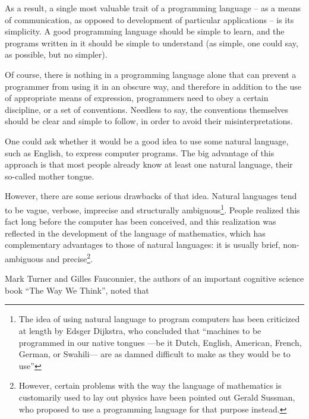 As a result, a single most valuable trait of a programming language
-- as a means of communication, as opposed to development of particular
applications -- is its simplicity. A good programming language should
be simple to learn, and the programs written in it should be simple
to understand (as simple, one could say, as possible, but no simpler).

Of course, there is nothing in a programming language alone that
can prevent a programmer from using it in an obscure way, and therefore
in addition to the use of appropriate means of expression, programmers
need to obey a certain discipline, or a set of conventions. Needless
to say, the conventions themselves should be clear and simple to follow,
in order to avoid their misinterpretations.

One could ask whether it would be a good idea to use some natural language,
such as English, to express computer programs. The big advantage of this
approach is that most people already know at least one natural language,
their so-called mother tongue.

However, there are some serious drawbacks of that idea. Natural languages
tend to be vague, verbose, imprecise and structurally ambiguous\footnote{
  The idea of using natural language to program computers has been criticized
  at length by Edsger Dijkstra, who concluded that ``machines to be programmed
  in our native tongues —be it Dutch, English, American, French, German,
  or Swahili— are as damned difficult to make as they would be to
  use''\cite{Dijkstra1997}}.
People realized this fact long before the computer has been conceived, and this
realization was reflected in the development of the language of mathematics,
which has complementary advantages to those of natural languages: it is
usually brief, non-ambiguous and precise\footnote{However, certain problems
  with the way the language of mathematics is customarily used to lay out
  physics have been pointed out Gerald Sussman, who proposed to use a programming
  language for that purpose instead\cite{SICM}.}.

Mark Turner and Gilles Fauconnier, the authors of an important cognitive science
book ``The Way We Think'', noted that

